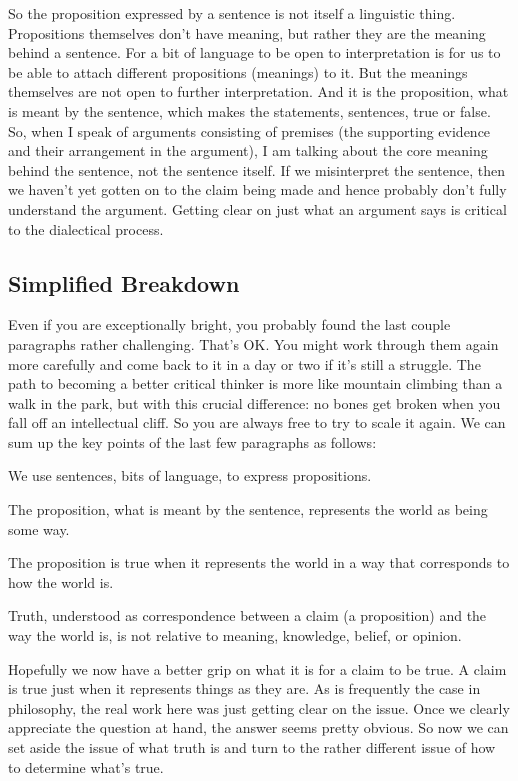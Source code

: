 So the proposition expressed by a sentence is not itself a linguistic thing. Propositions themselves don't have meaning, but rather they are the meaning behind a sentence. For a bit of language to be open to interpretation is for us to be able to attach different propositions (meanings) to it. But the meanings themselves are not open to further interpretation. And it is the proposition, what is meant by the sentence, which makes the statements, sentences, true or false. So, when I speak of arguments consisting of premises (the supporting evidence and their arrangement in the argument), I am talking about the core meaning behind the sentence, not the sentence itself. If we misinterpret the sentence, then we haven’t yet gotten on to the claim being made and hence probably don’t fully understand the argument. Getting clear on just what an argument says is critical to the dialectical process.

\subsection{Simplified Breakdown}

Even if you are exceptionally bright, you probably found the last couple paragraphs rather challenging. That’s OK. You might work through them again more carefully and come back to it in a day or two if it’s still a struggle. The path to becoming a better critical thinker is more like mountain climbing than a walk in the park, but with this crucial difference: no bones get broken when you fall off an intellectual cliff. So you are always free to try to scale it again. We can sum up the key points of the last few paragraphs as follows:
\begin{earg}
    \item[] We use sentences, bits of language, to express propositions.
    \item[] The proposition, what is meant by the sentence, represents the world as being some way.
    \item[] The proposition is true when it represents the world in a way that corresponds to how the world is.
    \item[] Truth, understood as correspondence between a claim (a proposition) and the way the world is, is not relative to meaning, knowledge, belief, or opinion.
\end{earg}
Hopefully we now have a better grip on what it is for a claim to be true. A claim is true just when it represents things as they are. As is frequently the case in philosophy, the real work here was just getting clear on the issue. Once we clearly appreciate the question at hand, the answer seems pretty obvious. So now we can set aside the issue of what truth is and turn to the rather different issue of how to determine what’s true.

